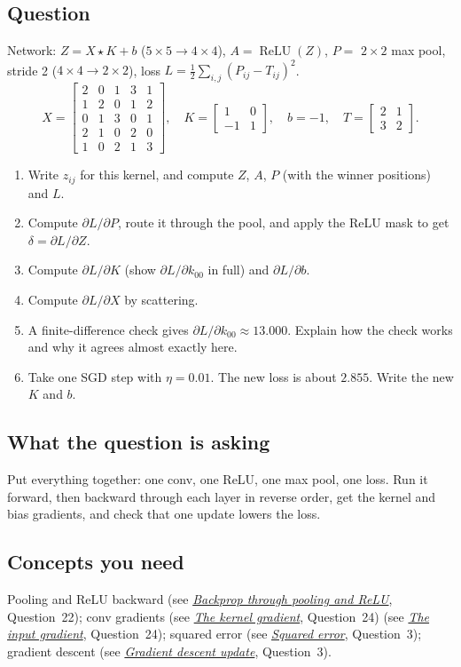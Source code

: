 \documentclass[12pt,a4paper]{article}
\newcommand{\seeconcept}[3]{(see \hyperref[#1]{\textit{#2}}, Question~#3)}
\newcommand{\relu}{\operatorname{ReLU}}
\begin{document}
\subsection*{Question}
Network: $Z=X\star K+b$ ($5\times5\to4\times4$), $A=\relu(Z)$, $P=$ $2\times2$ max pool, stride 2 ($4\times4\to2\times2$), loss $L=\tfrac12\sum_{i,j}(P_{ij}-T_{ij})^2$.
\[
X=\begin{bmatrix}2&0&1&3&1\\1&2&0&1&2\\0&1&3&0&1\\2&1&0&2&0\\1&0&2&1&3\end{bmatrix},\quad
K=\begin{bmatrix}1&0\\-1&1\end{bmatrix},\quad b=-1,\quad T=\begin{bmatrix}2&1\\3&2\end{bmatrix}.
\]
\begin{enumerate}[label=(\alph*)]
\item Write $z_{ij}$ for this kernel, and compute $Z$, $A$, $P$ (with the winner positions) and $L$.
\item Compute $\partial L/\partial P$, route it through the pool, and apply the ReLU mask to get $\delta=\partial L/\partial Z$.
\item Compute $\partial L/\partial K$ (show $\partial L/\partial k_{00}$ in full) and $\partial L/\partial b$.
\item Compute $\partial L/\partial X$ by scattering.
\item A finite-difference check gives $\partial L/\partial k_{00}\approx13.000$. Explain how the check works and why it agrees almost exactly here.
\item Take one SGD step with $\eta=0.01$. The new loss is about $2.855$. Write the new $K$ and $b$.
\end{enumerate}

\subsection*{What the question is asking}
Put everything together: one conv, one ReLU, one max pool, one loss. Run it forward, then backward through each layer in reverse order, get the kernel and bias gradients, and check that one update lowers the loss.

\subsection*{Concepts you need}
Pooling and ReLU backward \seeconcept{c:poolback}{Backprop through pooling and ReLU}{22}; conv gradients \seeconcept{c:convgradK}{The kernel gradient}{24} \seeconcept{c:convgradX}{The input gradient}{24}; squared error \seeconcept{c:sqerr}{Squared error}{3}; gradient descent \seeconcept{c:gd}{Gradient descent update}{3}.
\end{document}
